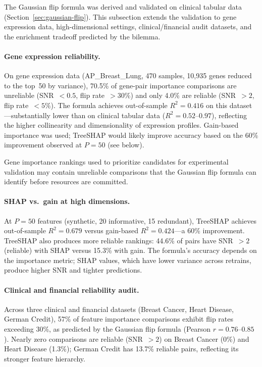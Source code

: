 \documentclass[11pt,a4paper]{article}
\begin{document}
The Gaussian flip formula was derived and validated on clinical tabular data
(Section~\ref{sec:gaussian-flip}).  This subsection extends the validation to
gene expression data, high-dimensional settings, clinical/financial audit
datasets, and the enrichment tradeoff predicted by the bilemma.

\paragraph{Gene expression reliability.}
On gene expression data (AP\_Breast\_Lung, 470 samples, 10{,}935 genes reduced
to the top~50 by variance), 70.5\% of gene-pair importance comparisons are
unreliable (SNR~$< 0.5$, flip rate~$> 30\%$) and only 4.0\% are reliable
(SNR~$> 2$, flip rate~$< 5\%$).  The formula achieves out-of-sample
$R^2 = 0.416$ on this dataset---substantially lower than on clinical tabular
data ($R^2 = 0.52\text{--}0.97$), reflecting the higher collinearity and
dimensionality of expression profiles.  Gain-based importance was used;
TreeSHAP would likely improve accuracy based on the 60\% improvement observed
at $P = 50$ (see below).

Gene importance rankings used to prioritize candidates for experimental
validation may contain unreliable comparisons that the Gaussian flip formula
can identify before resources are committed.

\paragraph{SHAP vs.\ gain at high dimensions.}
At $P = 50$ features (synthetic, 20 informative, 15 redundant), TreeSHAP
achieves out-of-sample $R^2 = 0.679$ versus gain-based $R^2 = 0.424$---a
60\% improvement.  TreeSHAP also produces more reliable rankings: 44.6\% of
pairs have SNR~$> 2$ (reliable) with SHAP versus 15.3\% with gain.  The
formula's accuracy depends on the importance metric; SHAP values, which have
lower variance across retrains, produce higher SNR and tighter predictions.

\paragraph{Clinical and financial reliability audit.}
Across three clinical and financial datasets (Breast Cancer, Heart Disease,
German Credit), 57\% of feature importance comparisons exhibit flip rates
exceeding 30\%, as predicted by the Gaussian flip formula (Pearson
$r = 0.76\text{--}0.85$).  Nearly zero comparisons are reliable (SNR~$> 2$) on
Breast Cancer (0\%) and Heart Disease (1.3\%); German Credit has 13.7\%
reliable pairs, reflecting its stronger feature hierarchy.
\end{document}
